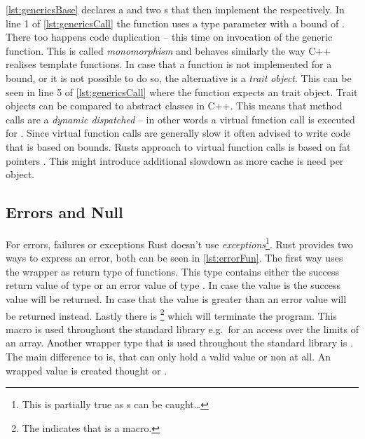 \documentclass[thesis]{subfiles}
\begin{document}
    \autoref{lst:genericsBase} declares a  and two s that then implement the  respectively.
    In line 1 of \autoref{lst:genericsCall} the function  uses a type parameter  with a bound of .
    There too happens code duplication -- this time on invocation of the generic function.
    This is called \emph{monomorphism} and behaves similarly the way C++ realises template functions.
    In case that a function is not implemented for a bound, or it is not possible to do so, the alternative is a \emph{trait object}.
    This can be seen in line 5 of \autoref{lst:genericsCall} where the function expects an trait object.
    Trait objects can be compared to abstract classes in C++.
    This means that method calls are a \emph{dynamic dispatched} -- in other words a virtual function call is executed for .
    Since virtual function calls are generally slow it often advised to write code that is based on bounds.
    Rusts approach to virtual function calls is based on fat pointers .
    This might introduce additional slowdown as more cache is need per object.

  \subsection{Errors and Null}
    For errors, failures or exceptions Rust doesn't use \emph{exceptions}\footnote{%
      This is partially true as s can be caught\ldots
    }.
    Rust provides two ways to express an error, both can be seen in \autoref{lst:errorFun}.
    The first way uses the  wrapper as return type of functions.
    This type contains either the success return value of type  or an error value of type .
    In case the value is  the success value will be returned.
    In case that the value is greater than  an error value will be returned instead.
    Lastly there is \footnote{%
      The \codr{!} indicates that  is a macro.
    } which will terminate the program.
    This macro is used throughout the standard library e.g.\ for an access over the limits of an array.
    Another wrapper type that is used throughout the standard library is .
    The main difference to  is, that  can only hold a valid value or non at all.
    An wrapped value is created thought  or .

    \newsavebox{\errorFun}
    \begin{lrbox}{\errorFun}%
      \begin{minipage}{.45\linewidth}
        
      \end{minipage}
    \end{lrbox}
\end{document}
